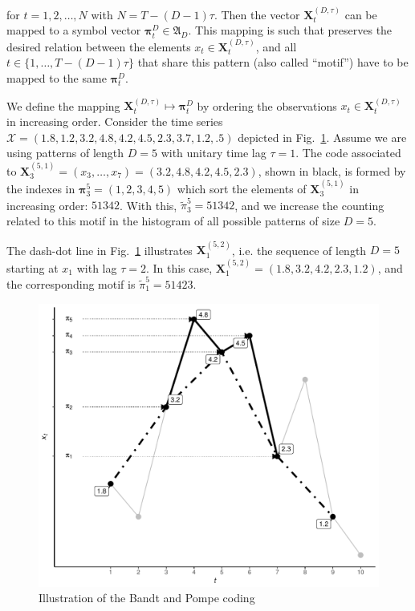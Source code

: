\documentclass[journal]{IEEEtran}
\begin{document}
	for $t = 1,2,\dots,N$ with $N = T-(D-1) \tau$.
	Then the vector ${\mathbf X}^{(D,\tau)}_t$ can be mapped to a symbol vector ${\bm \pi}_t^D \in {\mathfrak A}_{D}$. 
	This mapping is such that preserves the desired relation between the elements 
	$x_t  \in {\mathbf X}^{(D,\tau)}_t$, and all $t \in \{1,\dots,T-(D-1)\tau\}$ that share this pattern (also called ``motif'') have to be mapped to the same 
	${\bm \pi}_t^{D}$.
	
	We define the mapping ${\mathbf X}_t^{(D,\tau)} \mapsto {\mathbf \pi}_t^{D}$ by ordering the observations $x_t \in {\mathbf X}_t^{(D,\tau)}$ in increasing order.
	Consider the time series $\mathcal X = (1.8, 1.2, 3.2, 4.8, 4.2, 4.5, 2.3, 3.7, 1.2, .5)$ depicted in Fig.~\ref{Fig:IntroBP}.
	Assume we are using patterns of length $D=5$ with unitary time lag $\tau=1$.
	The code associated to $\mathbf X_{3}^{(5,1)}=(x_3,\dots,x_7)=(3.2, 4.8, 4.2, 4.5, 2.3)$, shown in black, is formed by the indexes in $\bm\pi_3^{5}=(1,2,3,4,5)$ which sort the elements of $\mathbf X_{3}^{(5,1)}$ in increasing order: $51342$.
	With this, $\widetilde{\pi}_3^{5} = 51342$, and we increase the counting related to this motif in the histogram of all possible patterns of size $D=5$.
	
	The dash-dot line in Fig.~\ref{Fig:IntroBP} illustrates $\mathbf X_{1}^{(5,2)}$, i.e. the sequence of length $D=5$ starting at $x_1$ with lag $\tau=2$.
	In this case, $\mathbf X_{1}^{(5,2)}= (1.8, 3.2, 4.2, 2.3, 1.2)$, and the corresponding motif is $\widetilde{\pi}_1^{5}=51423$.
	
	\begin{figure}[hbt]
		\centering
		\includegraphics[width=.9\linewidth]{Figures/IntroBP.pdf}
		\caption{Illustration of the Bandt and Pompe coding\label{Fig:IntroBP}}
	\end{figure}
	
\end{document}
